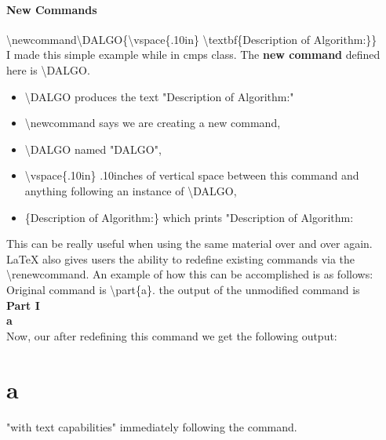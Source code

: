 \subsection{New Commands}


\textbackslash{newcommand}\textbackslash{DALGO}\{\textbackslash{vspace}\{.10in\}
\textbackslash{textbf}\{Description of Algorithm:\}\} \\

I made this simple example while in cmps class. 
The \textbf{new command} defined here is \textbackslash{DALGO}. \\
\begin{itemize}
    \item \textbackslash{DALGO} produces the text "Description of Algorithm:"
    \item \textbackslash{newcommand} says we are creating a new command, 
    \item \textbackslash{DALGO} named "DALGO",
    \item \textbackslash{vspace}\{.10in\} .10inches 
            of vertical space between this command 
            and anything following an instance of 
            \textbackslash{DALGO},
    \item \{Description of Algorithm:\} which prints "Description of Algorithm: 
\end{itemize}

This can be really useful when using the same material over and 
over again. \LaTeX{} also gives users the ability to redefine 
existing commands via the \textbackslash{renewcommand}.
An example of how this can be accomplished is as follows: \\

Original command is \textbackslash{part\{a\}}. the output of the 
unmodified command is\\ \textbf{Part I}\\ \textbf{a}\\
Now, our after redefining this command we get the following 
output:
\part{a} "with text capabilities" immediately following the 
command.  \\

